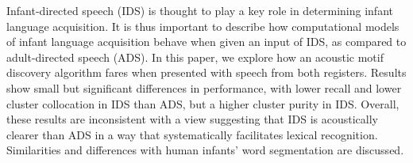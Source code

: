 Infant-directed speech (IDS) is thought to play a key role in determining infant language acquisition. It is thus important to describe how computational models of infant language acquisition behave when given an input of IDS, as compared to adult-directed speech (ADS). In this paper, we explore how an acoustic motif discovery algorithm fares when presented with speech from both registers. Results show small but significant differences in performance, with lower recall and lower cluster collocation in IDS than ADS, but a higher cluster purity in IDS. Overall, these results are inconsistent with a view suggesting that IDS is acoustically clearer than ADS in a way that systematically facilitates lexical recognition. Similarities and differences with human infants' word segmentation are discussed.
